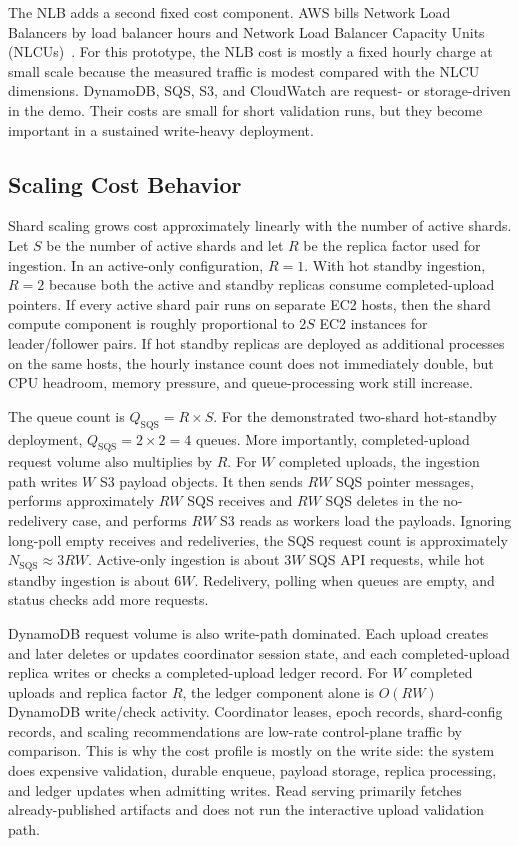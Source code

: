 \documentclass[conference]{IEEEtran}
\begin{document}
The NLB adds a second fixed cost component. AWS bills Network Load Balancers by load balancer hours and Network Load Balancer Capacity Units (NLCUs)~\cite{awselb}. For this prototype, the NLB cost is mostly a fixed hourly charge at small scale because the measured traffic is modest compared with the NLCU dimensions. DynamoDB, SQS, S3, and CloudWatch are request- or storage-driven in the demo. Their costs are small for short validation runs, but they become important in a sustained write-heavy deployment.

\subsection{Scaling Cost Behavior}

Shard scaling grows cost approximately linearly with the number of active shards. Let \(S\) be the number of active shards and let \(R\) be the replica factor used for ingestion. In an active-only configuration, \(R=1\). With hot standby ingestion, \(R=2\) because both the active and standby replicas consume completed-upload pointers. If every active shard pair runs on separate EC2 hosts, then the shard compute component is roughly proportional to \(2S\) EC2 instances for leader/follower pairs. If hot standby replicas are deployed as additional processes on the same hosts, the hourly instance count does not immediately double, but CPU headroom, memory pressure, and queue-processing work still increase.

The queue count is \(Q_{\mathrm{SQS}} = R \times S\). For the demonstrated two-shard hot-standby deployment, \(Q_{\mathrm{SQS}} = 2 \times 2 = 4\) queues. More importantly, completed-upload request volume also multiplies by \(R\). For \(W\) completed uploads, the ingestion path writes \(W\) S3 payload objects. It then sends \(R W\) SQS pointer messages, performs approximately \(R W\) SQS receives and \(R W\) SQS deletes in the no-redelivery case, and performs \(R W\) S3 reads as workers load the payloads. Ignoring long-poll empty receives and redeliveries, the SQS request count is approximately \(N_{\mathrm{SQS}} \approx 3 R W\). Active-only ingestion is about \(3W\) SQS API requests, while hot standby ingestion is about \(6W\). Redelivery, polling when queues are empty, and status checks add more requests.

DynamoDB request volume is also write-path dominated. Each upload creates and later deletes or updates coordinator session state, and each completed-upload replica writes or checks a completed-upload ledger record. For \(W\) completed uploads and replica factor \(R\), the ledger component alone is \(O(RW)\) DynamoDB write/check activity. Coordinator leases, epoch records, shard-config records, and scaling recommendations are low-rate control-plane traffic by comparison. This is why the cost profile is mostly on the write side: the system does expensive validation, durable enqueue, payload storage, replica processing, and ledger updates when admitting writes. Read serving primarily fetches already-published artifacts and does not run the interactive upload validation path.
\end{document}
